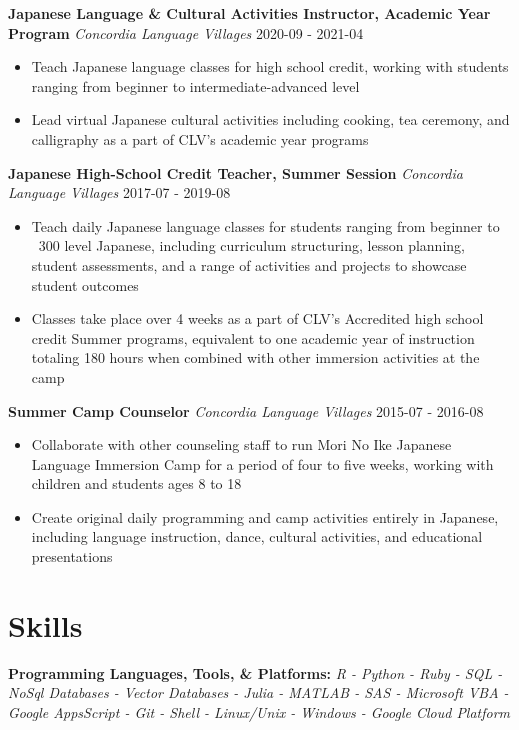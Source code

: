 \documentclass[a4paper,9pt]{extarticle}
\begin{document}
\noindent
\textbf{Japanese Language \& Cultural Activities Instructor, Academic Year Program}
\noindent
\textit{Concordia Language Villages} \hfill 2020-09 - 2021-04
\begin{itemize}
\item Teach Japanese language classes for high school credit, working with students ranging from beginner to intermediate-advanced level
\item Lead virtual Japanese cultural activities including cooking, tea ceremony, and calligraphy as a part of CLV's academic year programs
\end{itemize}

\noindent
\textbf{Japanese High-School Credit Teacher, Summer Session}
\noindent
\textit{Concordia Language Villages} \hfill 2017-07 - 2019-08
\begin{itemize}
\item Teach daily Japanese language classes for students ranging from beginner to ~300 level Japanese, including curriculum structuring, lesson planning, student assessments, and a range of activities and projects to showcase student outcomes
\item Classes take place over 4 weeks as a part of CLV's Accredited high school credit Summer programs, equivalent to one academic year of instruction totaling 180 hours when combined with other immersion activities at the camp
\end{itemize}

\noindent
\textbf{Summer Camp Counselor}
\noindent
\textit{Concordia Language Villages} \hfill 2015-07 - 2016-08
\begin{itemize}
\item Collaborate with other counseling staff to run Mori No Ike Japanese Language Immersion Camp for a period of four to five weeks, working with children and students ages 8 to 18
\item Create original daily programming and camp activities entirely in Japanese, including language instruction, dance, cultural activities, and educational presentations
\end{itemize}

\section*{Skills}

\noindent
\textbf{Programming Languages, Tools, \& Platforms:}
\textit{R - Python - Ruby - SQL - NoSql Databases - Vector Databases - Julia - MATLAB - SAS - Microsoft VBA - Google AppsScript - Git - Shell - Linux/Unix - Windows - Google Cloud Platform}
\end{document}
